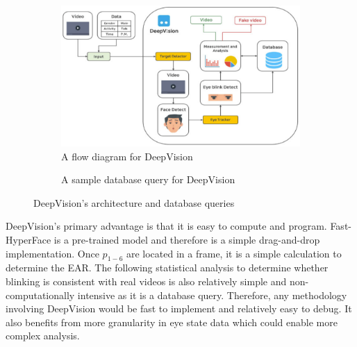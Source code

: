 \begin{figure}[H]
    \centering
    \begin{subfigure}{0.45\textwidth}
        \centering
        \includegraphics[width=\linewidth]{dissertation//figures/deepvision-flow.png}
        \caption{A flow diagram for DeepVision\cite{jung2020deepvision}}
        \label{fig:deepvision-flow}
    \end{subfigure}
    \hfill
    \begin{subfigure}{0.45\textwidth}
        \centering
        \caption{A sample database query for DeepVision\cite{jung2020deepvision}}
        \label{fig:deepvision-database}
    \end{subfigure}
    \caption{DeepVision's architecture and database queries}
    \label{fig:deepvision}
\end{figure}

DeepVision's primary advantage is that it is easy to compute and program. Fast-HyperFace is a pre-trained model and therefore is a simple drag-and-drop implementation. Once $p_{1-6}$ are located in a frame, it is a simple calculation to determine the EAR. The following statistical analysis to determine whether blinking is consistent with real videos is also relatively simple and non-computationally intensive as it is a database query. Therefore, any methodology involving DeepVision would be fast to implement and relatively easy to debug. It also benefits from more granularity in eye state data which could enable more complex analysis.

